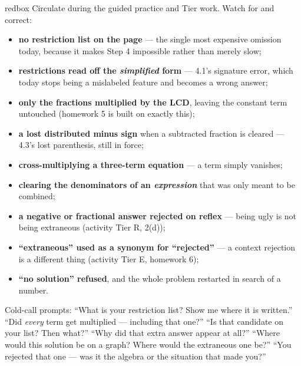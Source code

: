 \documentclass[10pt]{article}
\begin{document}
\begin{skillbox}{redbox}
Circulate during the guided practice and Tier work. Watch for and correct:
\begin{itemize}[leftmargin=1.2em, nosep]
  \item \textbf{no restriction list on the page} --- the single most expensive omission today, because it makes Step 4 impossible rather than merely slow;
  \item \textbf{restrictions read off the \emph{simplified} form} --- 4.1's signature error, which today stops being a mislabeled feature and becomes a wrong answer;
  \item \textbf{only the fractions multiplied by the LCD}, leaving the constant term untouched (homework 5 is built on exactly this);
  \item \textbf{a lost distributed minus sign} when a subtracted fraction is cleared --- 4.3's lost parenthesis, still in force;
  \item \textbf{cross-multiplying a three-term equation} --- a term simply vanishes;
  \item \textbf{clearing the denominators of an \emph{expression}} that was only meant to be combined;
  \item \textbf{a negative or fractional answer rejected on reflex} --- being ugly is not being extraneous (activity Tier R, 2(d));
  \item \textbf{``extraneous'' used as a synonym for ``rejected''} --- a context rejection is a different thing (activity Tier E, homework 6);
  \item \textbf{``no solution'' refused}, and the whole problem restarted in search of a number.
\end{itemize}
Cold-call prompts: ``What is your restriction list? Show me where it is written.'' ``Did \emph{every}
term get multiplied --- including that one?'' ``Is that candidate on your list? Then what?'' ``Why did
that extra answer appear at all?'' ``Where would this solution be on a graph? Where would the
extraneous one be?'' ``You rejected that one --- was it the algebra or the situation that made you?''
\end{skillbox}
\end{document}
